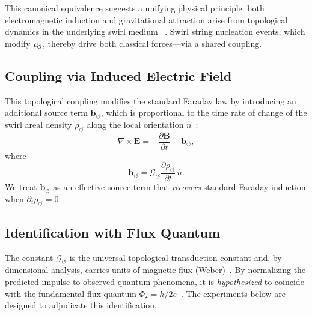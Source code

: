 \documentclass[10pt,reprint,aps,onecolumn,nofootinbib]{revtex4-2}
\newcommand{\vect}[1]{\boldsymbol{#1}} %
\newcommand{\EE}{\vect{E}}
\newcommand{\BB}{\vect{B}}
\begin{document}
            This canonical equivalence suggests a unifying physical principle: both electromagnetic induction and gravitational attraction arise from topological dynamics in the underlying swirl medium~ \cite{EM_G}. Swirl string nucleation events, which modify \(\rho_{\mkern-2mu\scriptscriptstyle\boldsymbol{\circlearrowleft}}\), thereby drive both classical forces—via a shared coupling.

        \subsection*{Coupling via Induced Electric Field}
            This topological coupling modifies the standard Faraday law by introducing an additional source term $\vect{b}_{\circlearrowleft}$, which is proportional to the time rate of change of the swirl areal density $\rho_{\circlearrowleft}$ along the local orientation $\hat{n}$~\cite{EM_G}:
            \begin{equation} \label{eq:modfaraday}
                \nabla \times \EE = - \frac{\partial \BB}{\partial t} - \vect{b}_{\circlearrowleft},
            \end{equation}
            where
            \[
                \vect{b}_{\circlearrowleft} = \mathcal{G}_{\circlearrowleft} \frac{\partial \rho_{\circlearrowleft}}{\partial t} \,\hat{n}.
            \]
            We treat $\vect{b}_{\circlearrowleft}$ as an effective source term that \emph{recovers} standard Faraday induction when $\partial_t \rho_{\circlearrowleft}=0$.

        \subsection*{Identification with Flux Quantum}
            The constant $\mathcal{G}_{\circlearrowleft}$ is the universal topological transduction constant and, by dimensional analysis, carries units of magnetic flux (Weber)~\cite{EM_G}. By normalizing the predicted impulse to observed quantum phenomena, it is \emph{hypothesized} to coincide with the fundamental flux quantum $\Phi_\star=h/2e$~\cite{EM_G}. The experiments below are designed to adjudicate this identification.
\end{document}
